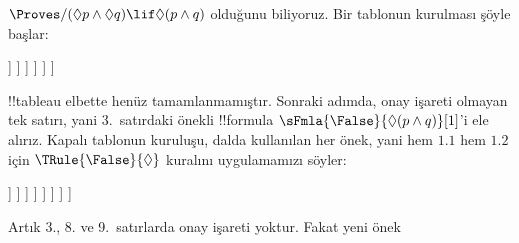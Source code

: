 {
\begin{ex}
  $\Proves/ (\Diamond p \land \Diamond q) \lif \Diamond(p \land q)$
  olduğunu biliyoruz. Bir tablonun kurulması şöyle başlar:
  \begin{oltableau}
    [\pFmla{\False}{(\Diamond p \land \Diamond q) \lif \Diamond(p \land q)}{1},
      just = \TAss, checked
      [\pFmla{\True}{\Diamond p \land \Diamond q}{1},
        just = {\TRule{\False}{\lif}[1]}, checked
        [\pFmla{\False}{\Diamond(p \land q)}{1},
          just = {\TRule{\False}{\lif}[1]}
          [\pFmla{\True}{\Diamond p}{1},
            just = {\TRule{\True}{\land}[2]}, checked
            [\pFmla{\True}{\Diamond q}{1},
              just = {\TRule{\True}{\land}[2]}, checked
              [\pFmla{\True}{p}{1.1}, 
                just = {\TRule{\True}{\Diamond}[4]}, checked
                [\pFmla{\True}{q}{1.2}, 
                  just = {\TRule{\True}{\Diamond}[5]}, checked
                ]
              ]
            ]
          ]
        ]
      ]
    ]
  \end{oltableau}
  !!{tableau} elbette henüz tamamlanmamıştır. Sonraki adımda, onay işareti
  olmayan tek satırı, yani $3$.~satırdaki önekli !!{formula}
  $\sFmla{\False}{\Diamond(p \land q)}[1]$'i ele alırız. Kapalı tablonun
  kuruluşu, dalda kullanılan her önek, yani hem $1.1$ hem $1.2$ için
  $\TRule{\False}{\Diamond}$ kuralını uygulamamızı söyler:
  \begin{oltableau}
    [\pFmla{\False}{(\Diamond p \land \Diamond q) \lif \Diamond(p \land q)}{1},
      just = \TAss, checked
      [\pFmla{\True}{\Diamond p \land \Diamond q}{1},
        just = {\TRule{\False}{\lif}[1]}, checked
        [\pFmla{\False}{\Diamond (p \land q)}{1},
          just = {\TRule{\False}{\lif}[1]}
          [\pFmla{\True}{\Diamond p}{1},
            just = {\TRule{\True}{\land}[2]}, checked
            [\pFmla{\True}{\Diamond q}{1},
              just = {\TRule{\True}{\land}[2]}, checked
              [\pFmla{\True}{p}{1.1}, 
                just = {\TRule{\True}{\Diamond}[4]}, checked
                [\pFmla{\True}{q}{1.2}, 
                  just = {\TRule{\True}{\Diamond}[5]}, checked
                  [\pFmla{\False}{p \land q}{1.1}, 
                    just = {\TRule{\False}{\Diamond}[3]}
                    [\pFmla{\False}{p \land q}{1.2}, 
                      just = {\TRule{\False}{\Diamond}[3]}
                    ]
                  ]
                ]
              ]
            ]
          ]
        ]
      ]
    ]
  \end{oltableau}
  Artık 3., 8. ve 9.~satırlarda onay işareti yoktur. Fakat yeni önek

\end{ex}}
